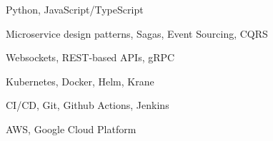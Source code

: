 \item Python, JavaScript/TypeScript
\item Microservice design patterns, Sagas, Event Sourcing, CQRS
\item Websockets, REST-based APIs, gRPC
\item Kubernetes, Docker, Helm, Krane
\item CI/CD, Git, Github Actions, Jenkins
\item AWS, Google Cloud Platform
